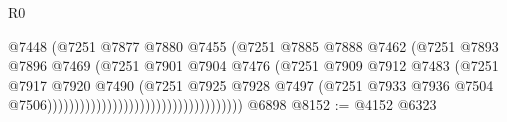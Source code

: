 \begin{lexlean}{R0}
\begin{coremodule}
                                                            @7448
                                                            (@7251
                                                              @7877
                                                              @7880
                                                              @7455
                                                              (@7251
                                                                @7885
                                                                @7888
                                                                @7462
                                                                (@7251
                                                                  @7893
                                                                  @7896
                                                                  @7469
                                                                  (@7251
                                                                    @7901
                                                                    @7904
                                                                    @7476
                                                                    (@7251
                                                                      @7909
                                                                      @7912
                                                                      @7483
                                                                      (@7251
                                                                        @7917
                                                                        @7920
                                                                        @7490
                                                                        (@7251
                                                                          @7925
                                                                          @7928
                                                                          @7497
                                                                          (@7251
                                                                            @7933
                                                                            @7936
                                                                            @7504
                                                                            @7506))))))))))))))))))))))))))))))))))))
    @6898
@8152 := @4152 @6323

\end{coremodule}
\end{lexlean}
